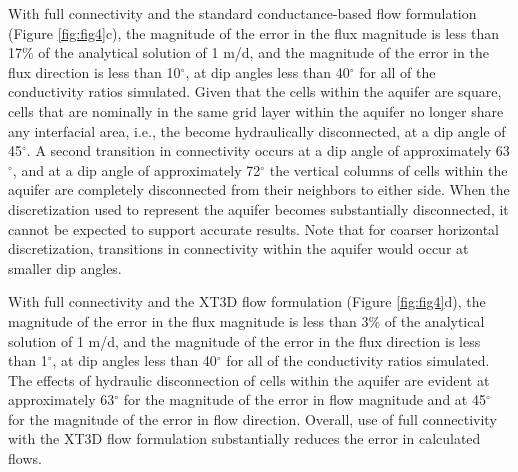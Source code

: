 \documentclass{article}
\begin{document}
With full connectivity and the standard conductance-based flow formulation (Figure \ref{fig:fig4}c), the magnitude of the error in the flux magnitude is less than 17\% of the analytical solution of 1 m/d, and the magnitude of the error in the flux direction is less than 10$^{\circ}$, at dip angles less than 40$^{\circ}$ for all of the conductivity ratios simulated. Given that the cells within the aquifer are square, cells that are nominally in the same grid layer within the aquifer no longer share any interfacial area, i.e., the become hydraulically disconnected, at a dip angle of 45$^{\circ}$. A second transition in connectivity occurs at a dip angle of approximately 63$^{\circ}$, and at a dip angle of approximately 72$^{\circ}$ the vertical columns of cells within the aquifer are completely disconnected from their neighbors to either side. When the discretization used to represent the aquifer becomes substantially disconnected, it cannot be expected to support accurate results. Note that for coarser horizontal discretization, transitions in connectivity within the aquifer would occur at smaller dip angles.

With full connectivity and the XT3D flow formulation (Figure \ref{fig:fig4}d), the magnitude of the error in the flux magnitude is less than 3\% of the analytical solution of 1 m/d, and the magnitude of the error in the flux direction is less than 1$^{\circ}$, at dip angles less than 40$^{\circ}$ for all of the conductivity ratios simulated. The effects of hydraulic disconnection of cells within the aquifer are evident at approximately 63$^{\circ}$ for the magnitude of the error in flow magnitude and at 45$^{\circ}$  for the magnitude of the error in flow direction. Overall, use of full connectivity with the XT3D flow formulation substantially reduces the error in calculated flows.
\end{document}
